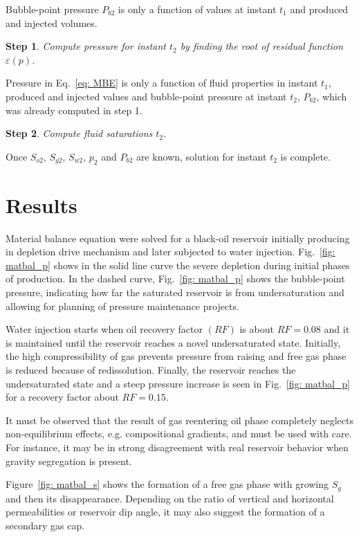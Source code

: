 \documentclass[authoryear,preprint,review,11pt]{elsarticle}
\newtheorem{step}{Step}
\begin{document}
Bubble-point pressure $P_{b2}$ is only a function of values at instant $t_1$ and produced and injected volumes.

\begin{step}
Compute pressure for instant $t_2$ by finding the root of residual function $\varepsilon \left(p\right)$.
\end{step}

Pressure in Eq.~\eqref{eq: MBE} is only a function of fluid properties in instant $t_1$, produced and injected values and bubble-point pressure at instant $t_2$, $P_{b2}$, which was already computed in step 1.

\begin{step}
Compute fluid saturations $t_2$.
\end{step}

Once $S_{o2}$, $S_{g2}$, $S_{w2}$, $p_2$ and $P_{b2}$ are known, solution for instant $t_2$ is complete.

\section{Results}
Material balance equation were solved for a black-oil reservoir initially producing in depletion drive mechanism and later subjected to water injection. Fig.~\ref{fig: matbal_p} shows in the solid line curve the severe depletion during initial phases of production. In the dashed curve, Fig.~\ref{fig: matbal_p} shows the bubble-point pressure, indicating how far the saturated reservoir is from undersaturation and allowing for planning of pressure maintenance projects.


Water injection starts when oil recovery factor $(RF)$ is about $RF=0.08$ and it is maintained until the reservoir reaches a novel undersaturated state. Initially, the high compressibility of gas prevents pressure from raising and free gas phase is reduced because of redissolution. Finally, the reservoir reaches the undersaturated state and a steep pressure increase is seen in Fig.~\ref{fig: matbal_p} for a recovery factor about $RF=0.15$.

It must be observed that the result of gas reentering oil phase completely neglects non-equilibrium effects, e.g. compositional gradients, and must be used with care. For instance, it may be in strong disagreement with real reservoir behavior when gravity segregation is present.

Figure~\ref{fig: matbal_s} shows the formation of a free gas phase with growing $S_g$ and then its disappearance. Depending on the ratio of vertical and horizontal permeabilities or reservoir dip angle, it may also suggest the formation of a secondary gas cap.
\end{document}
